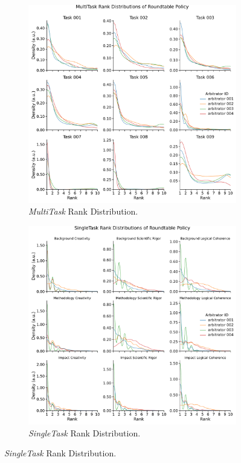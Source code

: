 \begin{figure}[h]
  \centering
  \begin{subfigure}[b]{0.49\textwidth}
    \includegraphics[width=\linewidth]{figures/arbitrator_analysis/multitask_rank_distribution.pdf}
    \caption{\footnotesize \emph{MultiTask} Rank Distribution.}
    \label{fig:sub1}
  \end{subfigure}
  \hfill
  \begin{subfigure}[b]{0.49\textwidth}
    \includegraphics[width=\linewidth]{figures/arbitrator_analysis/singletask_rank_distribution.pdf}
    \caption{\footnotesize \emph{SingleTask} Rank Distribution.}
    \label{fig:sub2}
  \end{subfigure}


\end{figure}
